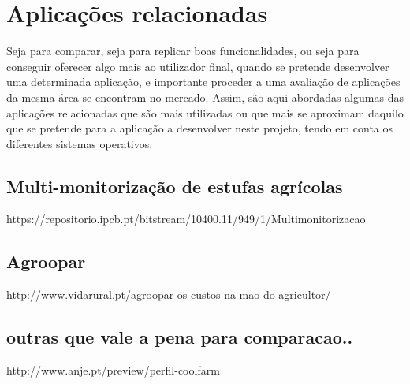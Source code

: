 \newpage
\section{Aplicações relacionadas}



Seja para comparar, seja para replicar boas funcionalidades, ou seja para conseguir oferecer algo mais ao utilizador final, quando se pretende desenvolver uma determinada aplicação, e
importante proceder a uma avaliação de aplicações da mesma área se encontram no mercado.
Assim, são aqui abordadas algumas das aplicações relacionadas que são mais utilizadas ou que mais se aproximam daquilo que se pretende para a aplicação a desenvolver neste projeto,
tendo em conta os diferentes sistemas operativos.



\subsection{Multi-monitorização de estufas agrícolas }

https://repositorio.ipcb.pt/bitstream/10400.11/949/1/Multimonitorizacao%

\subsection{Agroopar}

http://www.vidarural.pt/agroopar-os-custos-na-mao-do-agricultor/


\subsection{outras que vale a pena para comparacao..}



http://www.anje.pt/preview/perfil-coolfarm



\cite{Abreu2012}


\newpage









